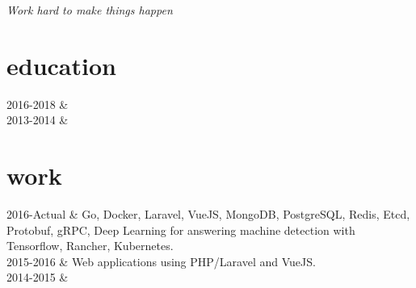 \documentclass[]{cv-mauri}
\begin{document}

\textit{Work hard to make things happen}

\section*{education}
\begin{tabularcv}
    2016-2018   &   
                    \\[\vspacepar] %
    2013-2014   &   
\end{tabularcv}

\section*{work}
\begin{tabularcv}
    2016-Actual   &   
                    \newline 
                    Go, Docker, Laravel, VueJS, MongoDB, PostgreSQL, Redis, Etcd, Protobuf, gRPC, Deep Learning for answering machine detection with Tensorflow, Rancher, Kubernetes.
                    \\[\vspacepar]
    2015-2016   &   
                    \newline Web applications using PHP/Laravel and VueJS.
                    \\[\vspacepar]
	2014-2015   &   
\end{tabularcv}
\end{document}
